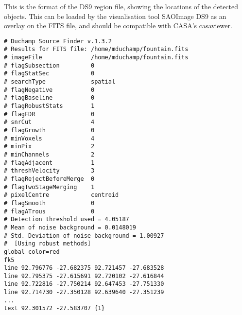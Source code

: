 %
%
%
%
\label{app-ds9}

This is the format of the DS9 region file, showing the locations
of the detected objects. This can be loaded by the visualisation tool
SAOImage DS9 as an overlay on the FITS file, and should be compatible
with CASA's casaviewer.

\begin{verbatim}
# Duchamp Source Finder v.1.3.2
# Results for FITS file: /home/mduchamp/fountain.fits
# imageFile              /home/mduchamp/fountain.fits
# flagSubsection         0
# flagStatSec            0
# searchType             spatial
# flagNegative           0
# flagBaseline           0
# flagRobustStats        1
# flagFDR                0
# snrCut                 4
# flagGrowth             0
# minVoxels              4
# minPix                 2
# minChannels            2
# flagAdjacent           1
# threshVelocity         3
# flagRejectBeforeMerge  0
# flagTwoStageMerging    1
# pixelCentre            centroid
# flagSmooth             0
# flagATrous             0
# Detection threshold used = 4.05187
# Mean of noise background = 0.0148019
# Std. Deviation of noise background = 1.00927
#  [Using robust methods]
global color=red 
fk5
line 92.796776 -27.682375 92.721457 -27.683528
line 92.795375 -27.615691 92.720102 -27.616844
line 92.722816 -27.750214 92.647453 -27.751330
line 92.714730 -27.350128 92.639640 -27.351239
...
text 92.301572 -27.583707 {1}
\end{verbatim}

